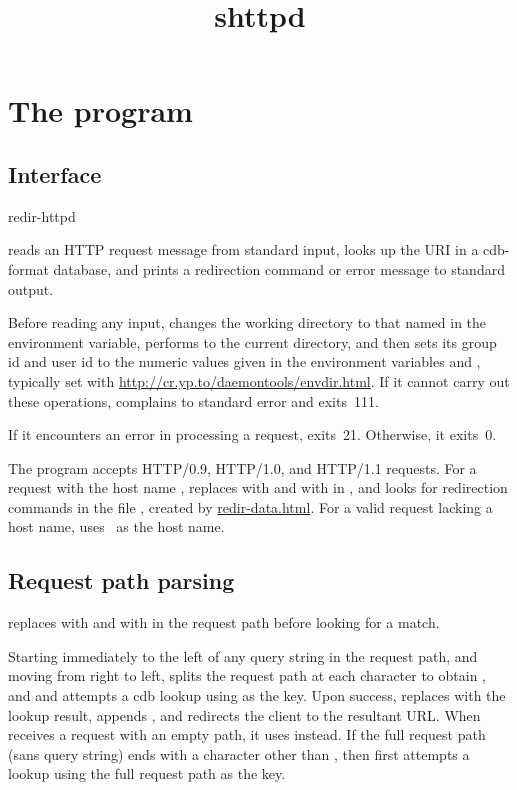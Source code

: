 \documentclass{book}
\title{shttpd}
\begin{document}
\section{The  program}

\subsection{Interface}
\begin{code}
  redir-httpd
\end{code}

 reads an HTTP request message from standard input,
looks up the URI in a cdb-format database, and prints a redirection
command or error message to standard output.

Before reading any input,  changes the working
directory to that named in the  environment variable,
performs  to the current directory, and then sets its
group id and user id to the numeric values given in the environment
variables  and , typically set with
\href{\cmd{envdir}}{http://cr.yp.to/daemontools/envdir.html}.
If it cannot carry out these operations,  complains
to standard error and exits~111.

If it encounters an error in processing a request, 
exits~21.  Otherwise, it exits~0.

The  program accepts HTTP/0.9, HTTP/1.0, and HTTP/1.1 requests.
For a request with the host name ,  replaces
 with \cmd{/:} and \cmd{//} with \cmd{/} in , and
looks for redirection commands in the file , created
by \href{\cmd{redir-data}}{redir-data.html}.  For a valid request lacking a host
name,  uses~ as the host name.

\subsection{Request path parsing}

 replaces  with \cmd{/:} and \cmd{//} with \cmd{/} in
the request path before looking for a match.

Starting immediately to the left of any query string in the request path,
and moving from right to left,
splits the request path at each \cmd{/} character to obtain
,
and and attempts a cdb lookup using
as the key.
Upon success,
replaces
with the lookup result, appends
,
and redirects the client to the resultant URL.
When
receives a request with an empty path, it uses
\cmd{/}
instead.
If the full request path (sans query string) ends with a
character other than
\cmd{/},
then
first attempts a lookup using the full request path as the key.
\end{document}
